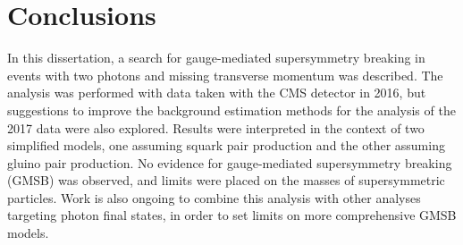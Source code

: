 \chapter{Conclusions}
\label{chap:Conclusions}

In this dissertation, a search for gauge-mediated supersymmetry breaking in events with two photons and missing transverse momentum was described. The analysis was performed with data taken with the CMS detector in 2016, but suggestions to improve the background estimation methods for the analysis of the 2017 data were also explored. Results were interpreted in the context of two simplified models, one assuming squark pair production and the other assuming gluino pair production.  No evidence for gauge-mediated supersymmetry breaking (GMSB) was observed, and limits were placed on the masses of supersymmetric particles. Work is also ongoing to combine this analysis with other analyses targeting photon final states, in order to set limits on more comprehensive GMSB models. 